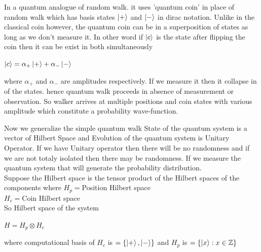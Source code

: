 \documentclass[11 pt]{article}
\theoremstyle{definition}
\theoremstyle{remark}
\newcommand{\tens}[1]{
  \mathbin{\mathop{\otimes}\limits_{#1}}}
\begin{document}
In a quantum analogue of random walk. it uses 'quantum coin' in place of random walk which has basis states $\ket{+}$ and $\ket{-}$ in dirac notation. Unlike in the classical coin however, the quantum coin can be in
a superposition of states as long as we don't measure it. In other word if $\ket{c}$ is the state after flipping the coin then it can be exist in both simultaneously
\begin{center}
    $\ket{c} = \alpha_{+}\ket{+} + \alpha_{-}\ket{-}$
\end{center}
where $\alpha_{+}$ and $\alpha_{-}$ are amplitudes respectively. If we measure it then it collapse in of the states. hence quantum walk proceeds in absence of measurement or observation. So walker arrives at multiple positions and coin states with various amplitude which constitute a probability wave-function.

Now we generalize the simple quantum walk State of the quantum system is a vector of Hilbert Space and Evolution of the quantum system is Unitary Operator. If we have Unitary operator then there will be no randomness and if we are not totaly isolated then there may be randomness. If we measure the quantum system that will generate the probability distribution.\\

Suppose the Hilbert space is the tensor product of the Hilbert spaces of the components where
\hspace{3cm} $H_{p} = $Position Hilbert space\\
\hspace{3cm} $H_{c} = $Coin Hilbert space\\
\hspace{3cm}So Hilbert space of the system \\
\begin{center}
    $H = H_{p} \tens{} H_{c}$
\end{center}
where computational basis of $H_{c}$ is $= \{\ket{+},\ket{-}\}$ and $H_{p}$ is $= \{\ket{x} : x\in \mathbb{Z} \}$
\end{document}
